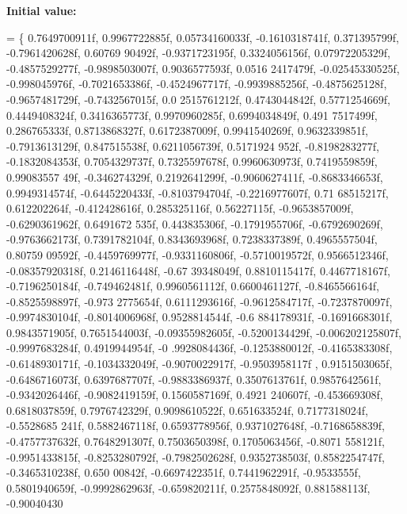 {\bfseries Initial value\+:}
\begin{DoxyCode}
=
    \{
        0.7649700911f, 0.9967722885f, 0.05734160033f, -0.1610318741f, 0.371395799f, -0.7961420628f, 0.60769
      90492f, -0.9371723195f, 0.3324056156f, 0.07972205329f, -0.4857529277f, -0.9898503007f, 0.9036577593f, 0.0516
      2417479f, -0.02545330525f, -0.998045976f,
        -0.7021653386f, -0.4524967717f, -0.9939885256f, -0.4875625128f, -0.9657481729f, -0.7432567015f, 0.0
      2515761212f, 0.4743044842f, 0.5771254669f, 0.4449408324f, 0.3416365773f, 0.9970960285f, 0.6994034849f, 0.491
      7517499f, 0.286765333f, 0.8713868327f,
        0.6172387009f, 0.9941540269f, 0.9632339851f, -0.7913613129f, 0.847515538f, 0.6211056739f, 0.5171924
      952f, -0.8198283277f, -0.1832084353f, 0.7054329737f, 0.7325597678f, 0.9960630973f, 0.7419559859f, 0.99083557
      49f, -0.346274329f, 0.2192641299f,
        -0.9060627411f, -0.8683346653f, 0.9949314574f, -0.6445220433f, -0.8103794704f, -0.2216977607f, 0.71
      68515217f, 0.612202264f, -0.412428616f, 0.285325116f, 0.56227115f, -0.9653857009f, -0.6290361962f, 0.6491672
      535f, 0.443835306f, -0.1791955706f,
        -0.6792690269f, -0.9763662173f, 0.7391782104f, 0.8343693968f, 0.7238337389f, 0.4965557504f, 0.80759
      09592f, -0.4459769977f, -0.9331160806f, -0.5710019572f, 0.9566512346f, -0.08357920318f, 0.2146116448f, -0.67
      39348049f, 0.8810115417f, 0.4467718167f,
        -0.7196250184f, -0.749462481f, 0.9960561112f, 0.6600461127f, -0.8465566164f, -0.8525598897f, -0.973
      2775654f, 0.6111293616f, -0.9612584717f, -0.7237870097f, -0.9974830104f, -0.8014006968f, 0.9528814544f, -0.6
      884178931f, -0.1691668301f, 0.9843571905f,
        0.7651544003f, -0.09355982605f, -0.5200134429f, -0.006202125807f, -0.9997683284f, 0.4919944954f, -0
      .9928084436f, -0.1253880012f, -0.4165383308f, -0.6148930171f, -0.1034332049f, -0.9070022917f, -0.9503958117f
      , 0.9151503065f, -0.6486716073f, 0.6397687707f,
        -0.9883386937f, 0.3507613761f, 0.9857642561f, -0.9342026446f, -0.9082419159f, 0.1560587169f, 0.4921
      240607f, -0.453669308f, 0.6818037859f, 0.7976742329f, 0.9098610522f, 0.651633524f, 0.7177318024f, -0.5528685
      241f, 0.5882467118f, 0.6593778956f,
        0.9371027648f, -0.7168658839f, -0.4757737632f, 0.7648291307f, 0.7503650398f, 0.1705063456f, -0.8071
      558121f, -0.9951433815f, -0.8253280792f, -0.7982502628f, 0.9352738503f, 0.8582254747f, -0.3465310238f, 0.650
      00842f, -0.6697422351f, 0.7441962291f,
        -0.9533555f, 0.5801940659f, -0.9992862963f, -0.659820211f, 0.2575848092f, 0.881588113f, -0.90040430

\end{DoxyCode}

